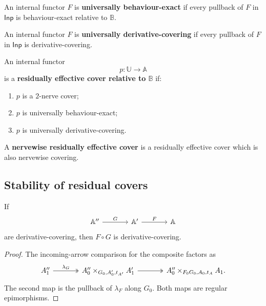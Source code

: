 \begin{definition}
\label{def:universally-behaviour-exact}
An internal functor \(F\) is \textbf{universally behaviour-exact} if every
pullback of \(F\) in \(\mathsf{Inp}\) is behaviour-exact relative to
\(\mathbb B\).
\end{definition}

\begin{definition}
\label{def:universally-derivative-covering}
An internal functor \(F\) is \textbf{universally derivative-covering} if every
pullback of \(F\) in \(\mathsf{Inp}\) is derivative-covering.
\end{definition}

\begin{definition}
\label{def:residually-effective-cover}
An internal functor
\[
    p:\mathbb U\to\mathbb A
\]
is a \textbf{residually effective cover relative to \(\mathbb B\)} if:
\begin{enumerate}
    \item \(p\) is a \(2\)-nerve cover;
    \item \(p\) is universally behaviour-exact;
    \item \(p\) is universally derivative-covering.
\end{enumerate}
\end{definition}

A \textbf{nervewise residually effective cover} is a residually effective
cover which is also nervewise covering.

\subsection{Stability of residual covers}
\label{subsec:stability-residual-covers}

\begin{lemma}
\label{lem:composition-derivative-covering}
If
\[
\begin{tikzcd}[column sep=large]
    \mathbb A''
        \arrow[r, "G"]
    &
    \mathbb A'
        \arrow[r, "F"]
    &
    \mathbb A
\end{tikzcd}
\]
are derivative-covering, then \(F\circ G\) is derivative-covering.
\end{lemma}

\begin{proof}
The incoming-arrow comparison for the composite factors as
\[
\begin{tikzcd}[column sep=large]
    A''_1
        \arrow[r, "\lambda_G", two heads]
    &
    A''_0\times_{G_0,A'_0,t_{A'}}A'_1
        \arrow[r, two heads]
    &
    A''_0\times_{F_0G_0,A_0,t_A}A_1.
\end{tikzcd}
\]
The second map is the pullback of \(\lambda_F\) along \(G_0\). Both maps are
regular epimorphisms.
\end{proof}

